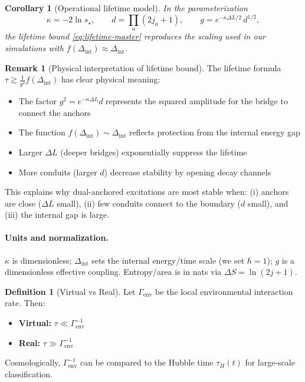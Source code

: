 \documentclass[11pt]{article}
\theoremstyle{plain}
\newtheorem{corollary}[theorem]{Corollary}
\theoremstyle{definition}
\newtheorem{definition}[theorem]{Definition}
\newtheorem{remark}[theorem]{Remark}
\begin{document}
\begin{corollary}[Operational lifetime model]\label{cor:operational-lifetime}
  In the parameterization
  \[
    \kappa = -2\ln s_\star,\qquad d=\prod_a (2j_a+1),\qquad g=e^{-\kappa \Delta L/2}\, d^{1/2},
  \]
  the lifetime bound \eqref{eq:lifetime-master} reproduces the scaling used in our simulations with $f(\Delta_{\mathrm{int}})\approx \Delta_{\mathrm{int}}$.
\end{corollary}

\begin{remark}[Physical interpretation of lifetime bound]
  The lifetime formula $\tau \gtrsim \frac{1}{g^2} f(\Delta_{\mathrm{int}})$ has clear physical meaning:
  \begin{itemize}
    \item The factor $g^2 = e^{-\kappa \Delta L} d$ represents the squared amplitude for the bridge to connect the anchors
    \item The function $f(\Delta_{\mathrm{int}}) \sim \Delta_{\mathrm{int}}$ reflects protection from the internal energy gap
    \item Larger $\Delta L$ (deeper bridges) exponentially suppress the lifetime
    \item More conduits (larger $d$) decrease stability by opening decay channels
  \end{itemize}
  This explains why dual-anchored excitations are most stable when: (i) anchors are close ($\Delta L$ small), (ii) few conduits connect to the boundary ($d$ small), and (iii) the internal gap is large.
\end{remark}

\paragraph{Units and normalization.}
$\kappa$ is dimensionless; $\Delta_{\mathrm{int}}$ sets the internal energy/time scale (we set $\hbar=1$); $g$ is a dimensionless effective coupling. Entropy/area is in nats via $\Delta S=\ln(2j+1)$.

\begin{definition}[Virtual vs Real]
  Let $\Gamma_{\mathrm{env}}$ be the local environmental interaction rate. Then:
  \begin{itemize}
    \item \textbf{Virtual:} $\tau \ll \Gamma_{\mathrm{env}}^{-1}$
    \item \textbf{Real:} $\tau \gg \Gamma_{\mathrm{env}}^{-1}$
  \end{itemize}
  Cosmologically, $\Gamma_{\mathrm{env}}^{-1}$ can be compared to the Hubble time $\tau_H(t)$ for large-scale classification.
\end{definition}
\end{document}
